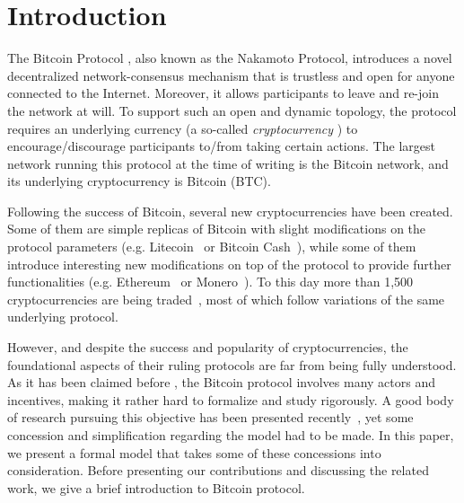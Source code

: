 
\section{Introduction}

The Bitcoin Protocol \cite{Bitcoin,DBLP:books/daglib/0040621,NC17}, also known as the Nakamoto Protocol, introduces a novel decentralized network-consensus mechanism that is trustless and open for anyone connected to the Internet. Moreover, it allows participants to leave and re-join the network at will. To support such an open and dynamic topology, the protocol requires an underlying currency (a so-called \emph{cryptocurrency} \cite{NC17}) to encourage/discourage participants to/from taking certain actions. The largest network running this protocol at the time of writing is the Bitcoin network, and its underlying cryptocurrency is Bitcoin (BTC). %
 
Following the success of Bitcoin, several new cryptocurrencies have been created. Some of them are simple replicas of Bitcoin with slight modifications on the protocol parameters (e.g. Litecoin~\cite{Litecoin} or Bitcoin Cash~\cite{Bcash}), while some of them introduce interesting new modifications on top of the protocol to provide further functionalities (e.g. Ethereum~\cite{Ethereum,E17} or Monero~\cite{Monero}). To this day more than 1,500 cryptocurrencies are being traded~\cite{coinmarketcap}, most of which follow variations of the same underlying protocol.

However, and despite the success and popularity of cryptocurrencies, the foundational aspects of their ruling protocols are far from being fully understood. As it has been claimed before \cite{mininggames:2016}, the Bitcoin protocol involves many actors and incentives, making it rather hard to formalize and study rigorously. A good body of research pursuing this objective has been presented recently~\cite{mininggames:2016,optimalselfishmining2017,instabilitywithoutreward:2016,selfishmining2014,stop_selfish_mining2014,eclipseattacks2015,LBSZR15,LJG15,stubborn_mining:2016,economics_of_mining2013,ZGR17,ABLZ17,MHG18,SZWTK18}, yet some concession and simplification regarding the model had to be made. In this paper, we present a formal model that takes some of these concessions into consideration. Before presenting our contributions and discussing the related work, we give a brief introduction to Bitcoin protocol. %

